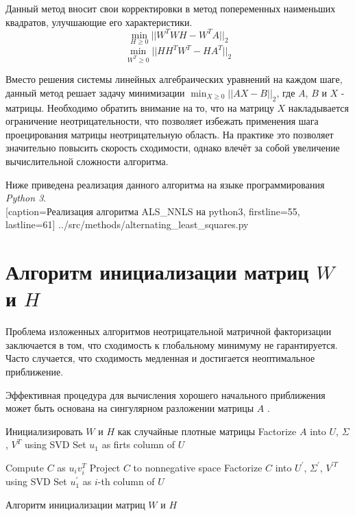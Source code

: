Данный метод вносит свои корректировки в метод попеременных наименьших квадратов,
улучшающие его характеристики.
\begin{equation}
  \min_{H \geq 0}||W^TWH - W^TA||_2
\end{equation}
\begin{equation}
  \min_{W^T \geq 0}||HH^TW^T - HA^T||_2
\end{equation}

Вместо решения системы линейных алгебраических уравнений на каждом шаге,
данный метод решает задачу минимизации $\displaystyle\min_{X \geq 0}||AX - B||_2$, где $A$, $B$ и $X$ - матрицы.
Необходимо обратить внимание на то, что на матрицу $X$ накладывается ограничение неотрицательности,
что позволяет избежать применения шага проецирования матрицы неотрицательную область.
На практике это позволяет значительно повысить скорость сходимости,
однако влечёт за собой увеличение вычислительной сложности алгоритма.

\newpage

Ниже приведена реализация данного алгоритма на языке программирования \textit{Python 3}.
\\


  [caption=Реализация алгоритма ALS\_NNLS на python3, firstline=55, lastline=61]
  {../src/methods/alternating_least_squares.py}





\newpage





\section{Алгоритм инициализации матриц $W$ и $H$}

Проблема изложенных алгоритмов неотрицательной матричной факторизации заключается в том,
что сходимость к глобальному минимуму не гарантируется.
Часто случается, что сходимость медленная и достигается неоптимальное приближение.

Эффективная процедура для вычисления хорошего начального приближения может быть основана на сингулярном разложении матрицы $A$ \cite{elden}.

\begin{algorithm}

  \BlankLine
  \BlankLine


  \BlankLine

  Инициализировать  $W$ и $H$ как случайные плотные матрицы\;
  Factorize $A$ into $U$, $\Sigma$, $V^T$ using SVD\;
  Set $u_1$ as firts column of $U$\;

   {
    Compute $C$ as $u_i v_i^T$\;
    Project $C$ to nonnegative space\;
    Factorize $C$ into $U^\prime$, $\Sigma^\prime$, $V^{\prime T}$ using SVD\;
    Set $u^\prime_1$ as $i$-th column of $U$\;
  }

  \BlankLine

  \caption{Алгоритм инициализации матриц $W$ и $H$}
\end{algorithm}

